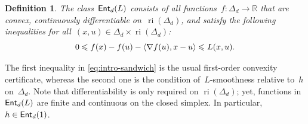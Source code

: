 \documentclass[11pt]{article}
\numberwithin{equation}{section}
\let\le\leqslant
\newtheorem{definition}{Definition}
\theoremstyle{remark}
\newcommand{\R}{\mathbb{R}}
\newcommand{\inner}[2]{\langle #1,#2\rangle}
\newcommand{\ri}{\operatorname{ri}}
\newcommand{\Ent}{\textup{\textsf{Ent}}}
\let\Div\relax\newcommand{\Div}{D_h}
\newcommand{\Fh}{\Ent_d}
\newcommand{\Simp}{\Delta_d}
\newcommand{\1}{\mathbf{1}}
\newcommand{\bnabla}{\nabla}
\begin{document}
\begin{definition}
\label{def:entropy-smoothness}
The class~$\Fh(L)$ consists of all functions~$f: \Simp \to \R$ that are convex, continuously differentiable on~$\ri(\Simp)$, and satisfy the following inequalities for all~$(x,u) \in \Simp \times \ri(\Simp)$:
\begin{equation} 
\label{eq:intro-sandwich} 
0 \le f(x)-f(u)-\inner{\bnabla f(u)}{x-u} \le L\Div(x,u).
\end{equation}
\end{definition}
%
\noindent
The first inequality in \eqref{eq:intro-sandwich} is the usual first-order convexity certificate, whereas the second one is the condition of~$L$-smoothness relative to~$h$ on~$\Simp$.
Note that differentiability is only required on \(\ri(\Simp)\); yet, functions in \(\Fh(L)\) are finite and continuous on the closed simplex. In particular,~$h\in\Fh(1)$.

\end{document}
